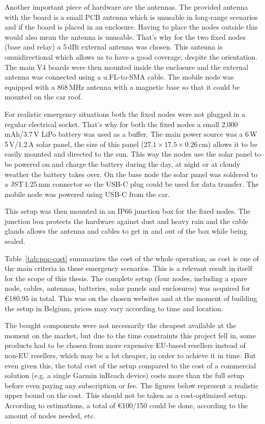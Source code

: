 Another important piece of hardware are the antennas. The provided antenna with the board is a small PCB antenna which is unusable in long-range scenarios and if the board is placed in an enclosure.
Having to place the nodes outside this would also mean the antenna is unusable. That's why for the two fixed nodes (base and relay) a 5\,dBi external antenna was chosen. This antenna is omnidirectional which allows us to have a good coverage, despite the orientation.
The main V4 boards were then mounted inside the enclosure and the external antenna was connected using a u.FL-to-SMA cable.
The mobile node was equipped with a 868\,MHz antenna with a magnetic base so that it could be mounted on the car roof.

For realistic emergency situations both the fixed nodes were not plugged in a regular electrical socket. That's why for both the fixed nodes a small 2,000\,mAh/3.7\,V LiPo battery was used as a buffer.
The main power source was a 6\,W 5\,V/1.2\,A solar panel, the size of this panel ($27.1 \times 17.5 \times 0.26$\,cm) allows it to be easily mounted and directed to the sun.
This way the nodes use the solar panel to be powered on and charge the battery during the day, at night or at cloudy weather the battery takes over.
On the base node the solar panel was soldered to a JST\,1.25\,mm connector so the USB-C plug could be used for data transfer.
The mobile node was powered using USB-C from the car.

This setup was then mounted in an IP66 junction box for the fixed nodes.
The junction box protects the hardware against dust and heavy rain and the cable glands allows the antenna and cables to get in and out of the box while being sealed.

Table~\ref{tab:poc-cost} summarizes the cost of the whole operation, as cost is one of the main criteria in these emergency scenarios.
This is a relevant result in itself for the scope of this thesis. The complete setup (four nodes, including a spare node, cables, antennas, batteries, solar panels and enclosures) was acquired for \euro{}180.95 in total.
This was on the chosen websites and at the moment of building the setup in Belgium, prices may vary according to time and location. 

The bought components were not necessarily the cheapest available at the moment on the market, but due to the time constraints this project fell in, some products had to be chosen from more expensive EU-based resellers instead of non-EU resellers, which may be a lot cheaper, in order to achieve it in time.
But even given this, the total cost of the setup compared to the cost of a commercial solution (e.g. a single Garmin inReach device) costs more than the full setup before even paying any subscription or fee.
The figures below represent a realistic upper bound on the cost. This should not be taken as a cost-optimized setup. According to estimations, a total of \euro{}100/150 could be done, according to the amount of nodes needed, etc.

